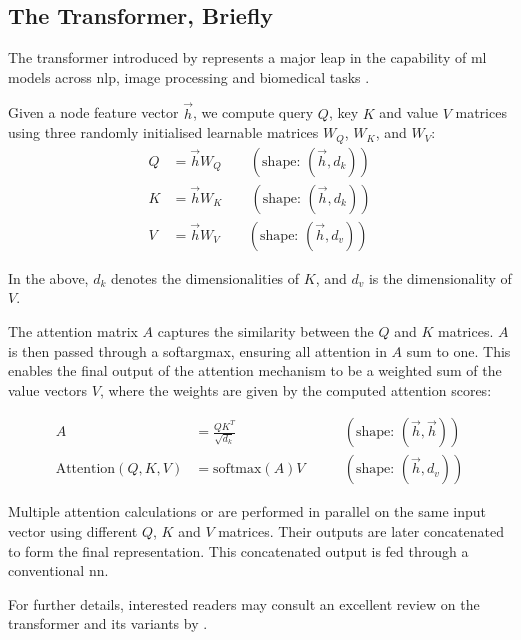 \subsection{The Transformer, Briefly}
The transformer introduced by \textcite{vaswani_attention_2017} represents a major leap in the capability of \gls{ml} models across \gls{nlp}, image processing and biomedical tasks \cite{devlin_bert_2018, brown_language_2020, parmar_image_2018, radford_learning_2021, elnaggar_prottrans_2020}. 

Given a node feature vector $\vec{h}$, we compute query $Q$, key $K$ and value $V$ matrices using three randomly initialised learnable matrices $W_Q$, $W_K$, and $W_V$:
\begin{align}
    Q &= \vec{h}W_Q \quad \quad (\text{shape: } (\vec{h}, d_k)) \label{eq:query} \\
    K &= \vec{h}W_K \quad \quad (\text{shape: } (\vec{h}, d_k)) \label{eq:key} \\
    V &= \vec{h}W_V \quad \quad (\text{shape: } (\vec{h}, d_v)) \label{eq:value}
\end{align}

In the above, $d_k$ denotes the dimensionalities of $K$, and $d_v$ is the dimensionality of $V$.

The attention matrix $A$ captures the similarity between the $Q$ and $K$ matrices. $A$ is then passed through a softargmax, ensuring all attention  in $A$ sum to one. This enables the final output of the attention mechanism to be a weighted sum of the value vectors $V$, where the weights are given by the computed attention scores:

\begin{align}
    A &= \frac{QK^T}{\sqrt{d_k}} \quad \quad &(\text{shape: } (\vec{h}, \vec{h})) \label{eq:attention_scores} \\
    \text{Attention}(Q, K, V) &= \text{softmax}(A)V \quad \quad &(\text{shape: } (\vec{h}, d_v)) \label{eq:attention}
\end{align}

Multiple attention calculations or  are performed in parallel on the same input vector using different $Q$, $K$ and $V$ matrices. Their outputs are later concatenated to form the final representation. This concatenated output is fed through a conventional \gls{nn}.

For further details, interested readers may consult an excellent review on the transformer and its variants by \textcite{lin_survey_2021}.
